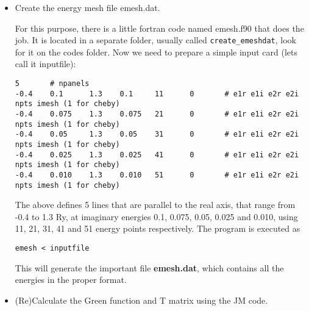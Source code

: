 \documentclass[a4paper,10pt,fullpage]{report}
\begin{document}
\begin{itemize}

\item Create the energy mesh file emesh.dat. 

For this purpose, there is a little
fortran code named emesh.f90 that does the job.
It is located in a separate folder, usually called \verb|create_emeshdat|,
look for it on the codes folder. Now we need to prepare a simple input card
(lets call it inputfile):
\begin{verbatim}
5       # npanels
-0.4    0.1      1.3    0.1     11      0       # e1r e1i e2r e2i npts imesh (1 for cheby)
-0.4    0.075    1.3    0.075   21      0       # e1r e1i e2r e2i npts imesh (1 for cheby)
-0.4    0.05     1.3    0.05    31      0       # e1r e1i e2r e2i npts imesh (1 for cheby)
-0.4    0.025    1.3    0.025   41      0       # e1r e1i e2r e2i npts imesh (1 for cheby)
-0.4    0.010    1.3    0.010   51      0       # e1r e1i e2r e2i npts imesh (1 for cheby)
\end{verbatim}
The above defines 5 lines that are parallel to the real axis, that range from
-0.4 to 1.3 Ry, at imaginary energies 0.1,  0.075, 0.05, 0.025 and 0.010,
using 11, 21, 31, 41 and 51 energy points respectively. The program is executed as
\begin{verbatim}
emesh < inputfile
\end{verbatim}
This will generate the important file \textbf{emesh.dat}, which contains all the energies
in the proper format. 

\item (Re)Calculate the Green function and T matrix using the JM code.


\end{itemize}
\end{document}

